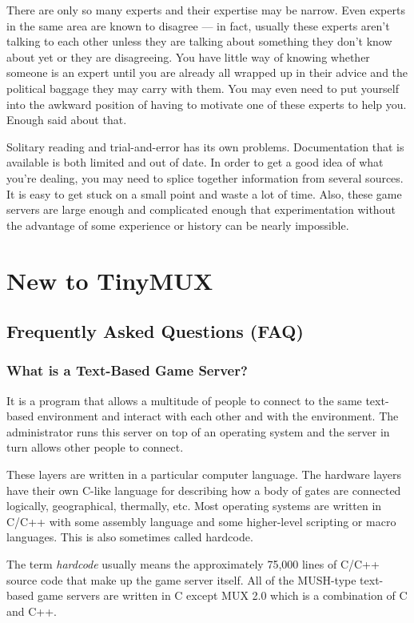 \documentclass[dvips]{book}
\begin{document}
There are only so many experts and their expertise may be narrow. Even experts
in the same area are known to disagree --- in fact, usually these experts
aren't talking to each other unless they are talking about something they don't
know about yet or they are disagreeing. You have little way of knowing whether
someone is an expert until you are already all wrapped up in their advice and
the political baggage they may carry with them. You may even need to put
yourself into the awkward position of having to motivate one of these experts
to help you. Enough said about that.

Solitary reading and trial-and-error has its own problems. Documentation that
is available is both limited and out of date. In order to get a good idea of
what you're dealing, you may need to splice together information from several
sources. It is easy to get stuck on a small point and waste a lot of time.
Also, these game servers are large enough and complicated enough that
experimentation without the advantage of some experience or history can be
nearly impossible.
\chapter{New to TinyMUX}
\section{Frequently Asked Questions (FAQ)}
\subsection{What is a Text-Based Game Server?}
It is a program that allows a multitude of people to connect to the same
text-based environment and interact with each other and with the environment.
The administrator runs this server on top of an operating system and the server
in turn allows other people to connect. %

These layers are written in a particular computer language. The hardware
layers have their own C-like language for describing how a body of gates are
connected logically, geographical, thermally, etc.  Most operating systems are
written in C/C++ with some assembly language and some higher-level scripting
or macro languages. This is also sometimes called hardcode.

The term \emph{hardcode} usually means the approximately 75,000 lines of C/C++
source code that make up the game server itself.
All of the MUSH-type text-based game servers are written in C except MUX 2.0
which is a combination of C and C++.
\end{document}
